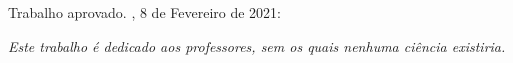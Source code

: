 
\begin{folhadeaprovacao}

 \begin{center}
   {\ABNTEXchapterfont\large\imprimirautor}

   \vspace*{\fill}\vspace*{\fill}
   \begin{center}
				\ABNTEXchapterfont\bfseries\Large\imprimirtitulo
			\end{center}
			\vspace*{\fill}

			\hspace{.45\textwidth}
			\begin{minipage}{.5\textwidth}
				\imprimirpreambulo
			\end{minipage}%
			\vspace*{\fill}
	\end{center}
    
	Trabalho aprovado. \imprimirlocal, 8 de Fevereiro de 2021:

  
	\begin{center}
		\vspace*{0.5cm}
		{\large\imprimirlocal}
  \par
  {\large\imprimirdata}
  \vspace*{1cm}
	\end{center}

\end{folhadeaprovacao}


\begin{dedicatoria}
\vspace*{\fill}
\centering
\noindent
\textit{Este trabalho é dedicado aos professores, sem os quais nenhuma ciência existiria.} \vspace*{\fill}
\end{dedicatoria}


%	

